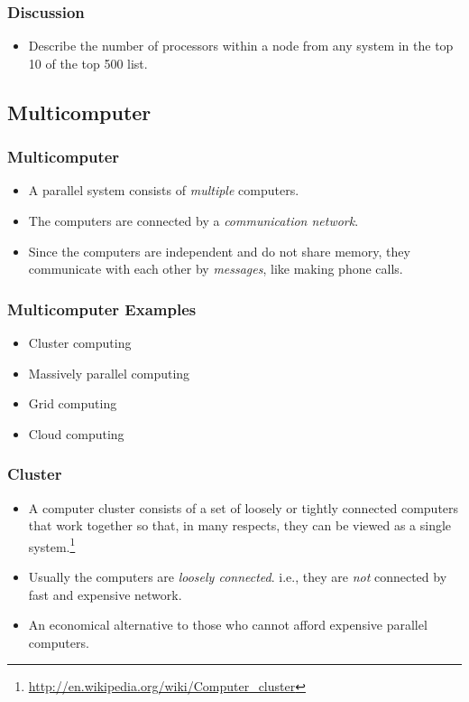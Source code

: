 \documentclass{beamer}
\begin{document}
\begin{CJK}{UTF8}{bsmi}
\begin{frame}
\frametitle{Discussion} 
\begin{itemize}
\item Describe the number of processors within a node from any system
  in the top 10 of the top 500 list.
\end{itemize}
\end{frame}


\subsection{Multicomputer}

\begin{frame}
\frametitle{Multicomputer} 
\begin{itemize}
\item A parallel system consists of {\em multiple} computers.
\item The computers are connected by a {\em communication network}.
\item Since the computers are independent and do not share memory,
  they communicate with each other by {\em messages}, like making
  phone calls.
\end{itemize}
\end{frame}

\begin{frame}
\frametitle{Multicomputer Examples} 
\begin{itemize}
\item Cluster computing
\item Massively parallel computing
\item Grid computing
\item Cloud computing
\end{itemize}
\end{frame}



\begin{frame}
\frametitle{Cluster}
\begin{itemize}
\item A computer cluster consists of a set of loosely or tightly
  connected computers that work together so that, in many respects,
  they can be viewed as a single
  system.\footnote{\url{http://en.wikipedia.org/wiki/Computer_cluster}}
\item Usually the computers are {\em loosely connected}. i.e., they
  are {\em not} connected by fast and expensive network.
\item An economical alternative to those who cannot afford expensive
  parallel computers.
\end{itemize}
\end{frame}


\end{CJK}
\end{document}
